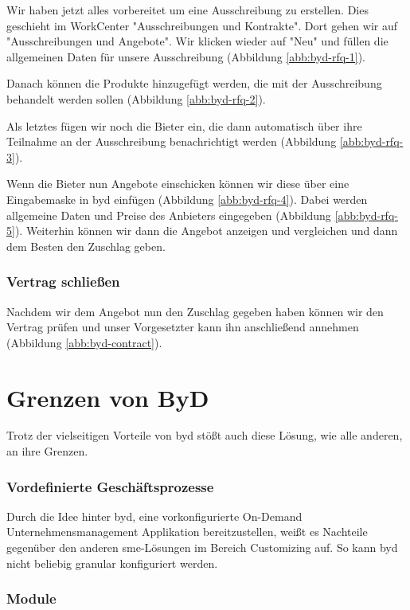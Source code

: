 Wir haben jetzt alles vorbereitet um eine Ausschreibung zu erstellen. Dies geschieht im WorkCenter "Ausschreibungen und Kontrakte". Dort gehen wir auf "Ausschreibungen und Angebote". Wir klicken wieder auf "Neu" und füllen die allgemeinen Daten für unsere Ausschreibung (Abbildung \ref{abb:byd-rfq-1}). 

Danach können die Produkte hinzugefügt werden, die mit der Ausschreibung behandelt werden sollen (Abbildung \ref{abb:byd-rfq-2}).

Als letztes fügen wir noch die Bieter ein, die dann automatisch über ihre Teilnahme an der Ausschreibung benachrichtigt werden (Abbildung \ref{abb:byd-rfq-3}).

Wenn die Bieter nun Angebote einschicken können wir diese über eine Eingabemaske in \gls{byd} einfügen (Abbildung \ref{abb:byd-rfq-4}). Dabei werden allgemeine Daten und Preise des Anbieters eingegeben (Abbildung \ref{abb:byd-rfq-5}). Weiterhin können wir dann die Angebot anzeigen und vergleichen und dann dem Besten den Zuschlag geben.

\subsubsection{Vertrag schließen}

Nachdem wir dem Angebot nun den Zuschlag gegeben haben können wir den Vertrag prüfen und unser Vorgesetzter kann ihn anschließend annehmen (Abbildung \ref{abb:byd-contract}).

\section{Grenzen von ByD}

Trotz der vielseitigen Vorteile von \gls{byd} stößt auch diese Lösung, wie alle anderen, an ihre Grenzen.

\subsubsection{Vordefinierte Geschäftsprozesse}

Durch die Idee hinter \gls{byd}, eine vorkonfigurierte On-Demand Unternehmensmanagement Applikation bereitzustellen, weißt es Nachteile gegenüber den anderen \gls{sme}-Lösungen im Bereich Customizing auf. So kann \gls{byd} nicht beliebig granular konfiguriert werden.

\subsubsection{Module}

